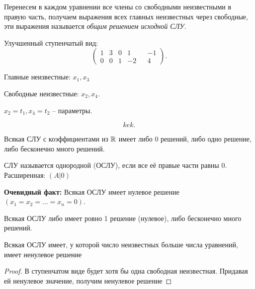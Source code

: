 \begin{description}
\begin{description}
        Перенесем в каждом уравнении все члены со свободными неизвестными в правую часть, получаем выражения всех главных неизвестных через свободные, эти выражения называется \textit{общим решением исходной СЛУ}.
    \end{description}
\end{description}

\begin{example}
    Улучшенный ступенчатый вид:
    \begin{equation*}
        \begin{pmatrix} 
            1 & 3 & 0 & 1 && -1 \\
            0 & 0 & 1 & -2 && 4
        \end{pmatrix} 
    .\end{equation*}

    Главные неизвестные: $x_1, x_3$

    Свободные неизвестные: $x_2, x_4$.

    $x_2 = t_1, x_4 = t_2$ -- параметры.

    \begin{equation*}
       kek %
    .\end{equation*}
\end{example}

\begin{consequence}
    Всякая СЛУ с коэффициентами из $\mathbb{R}$ имеет либо 0 решений, либо одно решение, либо бесконечно много решений.
\end{consequence}

\begin{definition}
    СЛУ называется однородной (ОСЛУ), если все её правые части равны 0. Расширенная: $(A | 0)$ 
\end{definition}

\textbf{Очевидный факт: } Всякая ОСЛУ имеет нулевое решение $(x_1 = x_2 = \dots = x_n = 0)$.

\begin{consequence}
    Всякая ОСЛУ либо имеет ровно 1 решение (нулевое), либо бесконечно много решений.
\end{consequence}

\begin{consequence}
    Всякая ОСЛУ имеет, у которой число неизвестных больше числа уравнений, имеет ненулевое решение
\end{consequence}

\begin{proof}
    В ступенчатом виде будет хотя бы одна свободная неизвестная. Придавая ей ненулевое значение, получим ненулевое решение
\end{proof}

